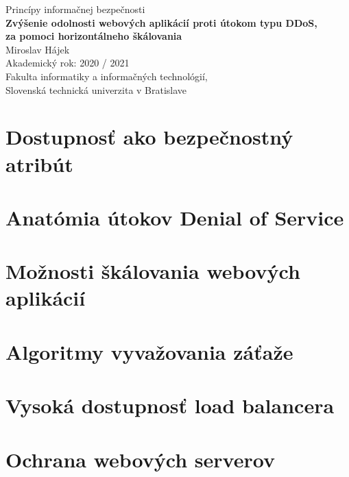\documentclass[11pt, a4paper]{article}
\begin{document}
\begin{titlepage}
    \hspace{0pt}
    \centering
    \vfill
    \large Princípy informačnej bezpečnosti \\
    \vspace{0.4cm}
    \vspace{1cm}
    \Large \textbf{ Zvýšenie odolnosti webových aplikácií proti útokom typu DDoS, 
          \\za pomoci horizontálneho škálovania  \\}
    \vspace{2.5cm}
    \normalsize Miroslav Hájek \\[0.2cm]
	Akademický rok: 2020 / 2021 \\[0.1cm]
	Fakulta informatiky a informačných technológií, \\
	Slovenská technická univerzita v Bratislave
    \vfill
\end{titlepage}



\tableofcontents
{}
\setcounter{page}{1}

\section{Dostupnosť ako bezpečnostný atribút}


\section{Anatómia útokov Denial of Service}


\section{Možnosti škálovania webových aplikácií}

\section{Algoritmy vyvažovania záťaže}


\section{Vysoká dostupnosť load balancera}


\section{Ochrana webových serverov}
\end{document}
